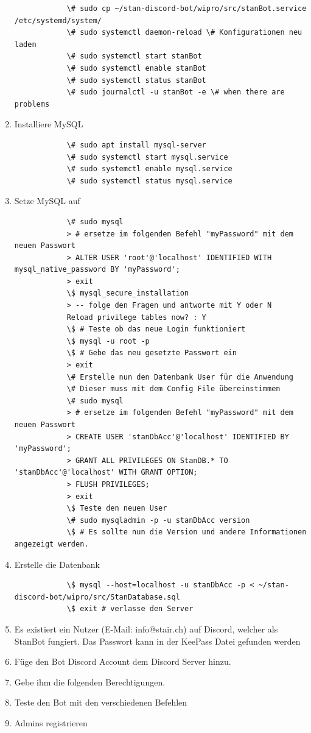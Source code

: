 \documentclass[a4paper, table]{article}
\begin{document}
\begin{enumerate}
\begin{lstlisting}
            \# sudo cp ~/stan-discord-bot/wipro/src/stanBot.service /etc/systemd/system/
            \# sudo systemctl daemon-reload \# Konfigurationen neu laden
            \# sudo systemctl start stanBot
            \# sudo systemctl enable stanBot
            \# sudo systemctl status stanBot
            \# sudo journalctl -u stanBot -e \# when there are problems
        \end{lstlisting}
    \item Installiere MySQL
        \begin{lstlisting}
            \# sudo apt install mysql-server
            \# sudo systemctl start mysql.service
            \# sudo systemctl enable mysql.service
            \# sudo systemctl status mysql.service
        \end{lstlisting}
    \item Setze MySQL auf
        \begin{verbatim}
            \# sudo mysql
            > # ersetze im folgenden Befehl "myPassword" mit dem neuen Passwort
            > ALTER USER 'root'@'localhost' IDENTIFIED WITH mysql_native_password BY 'myPassword';
            > exit
            \$ mysql_secure_installation
            > -- folge den Fragen und antworte mit Y oder N
            Reload privilege tables now? : Y
            \$ # Teste ob das neue Login funktioniert
            \$ mysql -u root -p
            \$ # Gebe das neu gesetzte Passwort ein
            > exit
            \# Erstelle nun den Datenbank User für die Anwendung
            \# Dieser muss mit dem Config File übereinstimmen
            \# sudo mysql
            > # ersetze im folgenden Befehl "myPassword" mit dem neuen Passwort
            > CREATE USER 'stanDbAcc'@'localhost' IDENTIFIED BY 'myPassword';
            > GRANT ALL PRIVILEGES ON StanDB.* TO 'stanDbAcc'@'localhost' WITH GRANT OPTION;
            > FLUSH PRIVILEGES;
            > exit
            \$ Teste den neuen User
            \# sudo mysqladmin -p -u stanDbAcc version
            \$ # Es sollte nun die Version und andere Informationen angezeigt werden.
        \end{verbatim}
    \item Erstelle die Datenbank
        \begin{lstlisting}
            \$ mysql --host=localhost -u stanDbAcc -p < ~/stan-discord-bot/wipro/src/StanDatabase.sql
            \$ exit # verlasse den Server
        \end{lstlisting}
    \item Es existiert ein Nutzer (E-Mail: info@stair.ch) auf Discord, welcher als StanBot fungiert. Das Passwort kann in der KeePass Datei gefunden werden
    \item Füge den Bot Discord Account dem Discord Server hinzu.
    \item Gebe ihm die folgenden Berechtigungen.
    \item Teste den Bot mit den verschiedenen Befehlen
    \item Admins registrieren
\end{enumerate}
\end{document}
